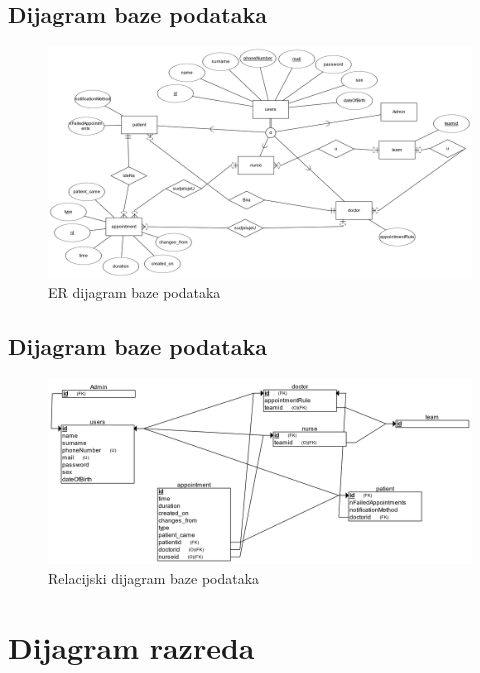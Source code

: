 			\subsection{Dijagram baze podataka}
				\begin{figure}[H]
			            \includegraphics[width=\textwidth]{image.png} %
			            \caption{ER dijagram baze podataka}
			            \label{fig:bp1} %
		            \end{figure}			
			\subsection{Dijagram baze podataka}
				\begin{figure}[H]
			            \includegraphics[width=\textwidth]{image(1).png} %
			            \caption{Relacijski dijagram baze podataka}
			            \label{fig:bp2} %
		            \end{figure}
		            
			
			\eject
			
			
		\section{Dijagram razreda}
		
